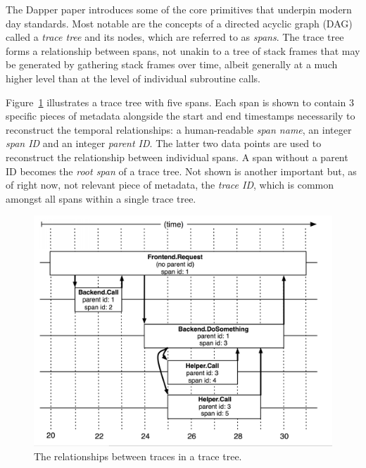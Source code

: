 \documentclass[pdftex,titlepage]{article}
\begin{document}
        The Dapper paper introduces some of the core primitives that underpin modern day standards. Most notable are the concepts
        of a directed acyclic graph (DAG) called a \textit{trace tree} and its nodes, which are referred to as \textit{spans}. 
        The trace tree forms a relationship between spans, not unakin to a tree of stack frames that may be generated by
        gathering stack frames over time, albeit generally at a much higher level than at the level of individual subroutine calls. 

        Figure~\ref{fig:dappertrace} illustrates a trace tree with five spans. Each span is shown to contain 3 specific pieces of
        metadata alongside the start and end timestamps necessarily to reconstruct the temporal relationships: a human-readable
        \textit{span name}, an integer \textit{span ID} and an integer \textit{parent ID}. The latter two
        data points are used to reconstruct the relationship between individual spans. A span without a parent ID becomes the 
        \textit{root span} of a trace tree. Not shown is another important but, as of right now, not relevant piece of metadata, the 
        \textit{trace ID}, which is common amongst all spans within a single trace tree.

        \begin{figure}[htb!]
            \centering
            \includegraphics[scale=0.9]{dappertrace}
            \caption{The relationships between traces in a trace tree.}
            \label{fig:dappertrace}
        \end{figure}
\end{document}
